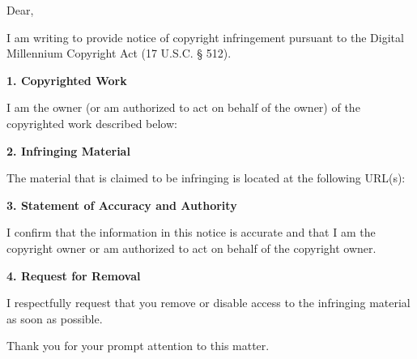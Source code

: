
Dear,

I am writing to provide notice of copyright infringement pursuant to the Digital Millennium Copyright Act (17 U.S.C. § 512).

\textbf{1. Copyrighted Work}

I am the owner (or am authorized to act on behalf of the owner) of the copyrighted work described below:

\textit{\CopyrightedContentDescription}

\textbf{2. Infringing Material}

The material that is claimed to be infringing is located at the following URL(s):

\textit{\InfringedContent}

\textbf{3. Statement of Accuracy and Authority}

I confirm that the information in this notice is accurate and that I am the copyright owner or am authorized to act on behalf of the copyright owner.

\textbf{4. Request for Removal}

I respectfully request that you remove or disable access to the infringing material as soon as possible.

Thank you for your prompt attention to this matter.

